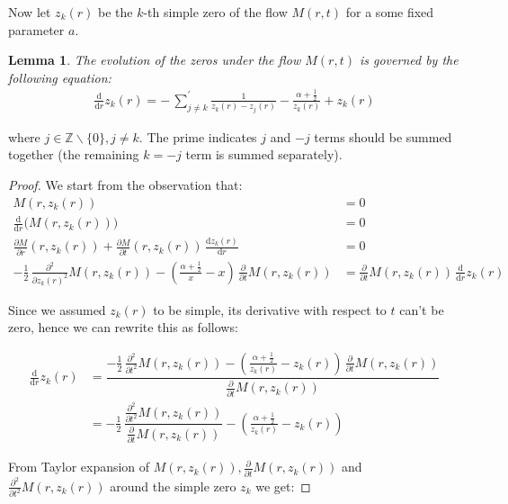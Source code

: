 \documentclass[a4paper,11pt,twoside]{amsart}
\newtheorem{lemma}[theorem]{Lemma}
\newcommand{\verifiedeq}{=}
\newcommand{\verifiedeq}{\stackrel{\checkmark}{=}}
\begin{document}
Now let $z_k(r)$ be the $k$-th simple zero of the flow $M(r,t)$ for a some fixed parameter $a$.
 
\begin{lemma}\label{proofBes2} The evolution of the zeros under the flow $M(r,t)$ is governed by the following equation:
\begin{align}
 \frac{\mathrm{d}}{\mathrm{d} r}z_k(r) \verifiedeq -\,\sum_{j \ne k}^{'} \frac{1}{z_k(r)-z_j(r)} -\frac{\alpha+\frac12}{z_k(r)}+z_k(r)
\end{align}
\end{lemma}
where $j \in \mathbb{Z}\backslash\{0\}, j \ne k$. The prime indicates $j$ and $-j$ terms should be summed together (the remaining $k=-j$ term is summed separately).
\begin{proof}

We start from the observation that:
\begin{align}
M(r,z_k(r)) &\verifiedeq 0 \\
\frac{\mathrm{d}}{\mathrm{d} r} \big(M(r,z_k(r))\big) &\verifiedeq 0 \\
\frac{\partial M}{\partial r}(r,z_k(r))+ \frac{\partial M}{\partial t}(r,z_k(r))\,\frac{\mathrm{d} z_k(r)}{\mathrm{d} r} &\verifiedeq 0 \\
-\frac12\,\frac{\partial^2}{\partial z_k(r)^2}M(r,z_k(r)) -\left(\frac{\alpha+\frac12}{x}-x\right)\,\frac{\partial }{\partial t}M(r,z_k(r))  &\verifiedeq \frac{\partial}{\partial t}M(r,z_k(r))\,\frac{\mathrm{d}}{\mathrm{d} r}z_k(r)
\end{align}

Since we assumed $z_k(r)$ to be simple, its derivative with respect to $t$ can't be zero, hence we can rewrite this as follows:

\begin{align}
\frac{\mathrm{d} }{\mathrm{d} r}z_k(r) &\verifiedeq \dfrac{-\frac12\,\frac{\partial^2}{\partial t^2}M(r,z_k(r)) -\left(\frac{\alpha+\frac12}{z_k(r)}-z_k(r)\right)\,\frac{\partial }{\partial t}M(r,z_k(r))}{ \frac{\partial}{\partial t}M(r,z_k(r))} \\
&\verifiedeq -\frac12\,\dfrac{\frac{\partial^2}{\partial t^2}M(r,z_k(r))}{ \frac{\partial}{\partial t}M(r,z_k(r))}  -\left(\frac{\alpha+\frac12}{z_k(r)}-z_k(r)\right) \label{secondder}
\end{align}

From Taylor expansion of $M(r,z_k(r)), \frac{\partial}{\partial t}M(r,z_k(r))$ and $\frac{\partial^2}{\partial t^2}M(r,z_k(r))$ around the simple zero $z_k$ we get:


\end{proof}
\end{document}
